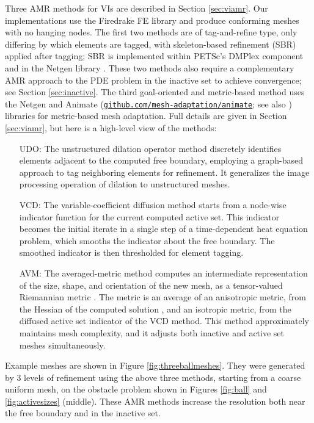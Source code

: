 \documentclass[]{interact}
\theoremstyle{plain}%
\theoremstyle{definition}
\theoremstyle{remark}
\begin{document}
Three AMR methods for VIs are described in Section \ref{sec:viamr}.  Our implementations use the Firedrake FE library \cite{Rathgeberetal2016} and produce conforming meshes with no hanging nodes.  The first two methods are of tag-and-refine type, only differing by which elements are tagged, with skeleton-based refinement (SBR) \cite{PlazaCarey2000} applied after tagging; SBR is implemented within PETSc's DMPlex component \cite{petsc-user-ref} and in the Netgen library \cite{Betteridgeetal2024}.  These two methods also require a complementary AMR approach to the PDE problem in the inactive set to achieve convergence; see Section \ref{sec:inactive}.  The third goal-oriented and metric-based method uses the Netgen and Animate (\href{https://github.com/mesh-adaptation/animate}{{\small \texttt{github.com/mesh-adaptation/animate}}}; see also \cite{Wallworketal2020}) libraries for metric-based mesh adaptation.  Full details are given in Section \ref{sec:viamr}, but here is a high-level view of the methods:

\begin{itemize}
\item[UDO:] The unstructured dilation operator method discretely identifies elements adjacent to the computed free boundary, employing a graph-based approach to tag neighboring elements for refinement.  It generalizes the image processing operation of dilation \cite{Pratt1991} to unstructured meshes.
\item[VCD:] The variable-coefficient diffusion method starts from a node-wise indicator function for the current computed active set.  This indicator becomes the initial iterate in a single step of a time-dependent heat equation problem, which smooths the indicator about the free boundary.  The smoothed indicator is then thresholded for element tagging.
\item[AVM:] The averaged-metric method computes an intermediate representation of the size, shape, and orientation of the new mesh, as a tensor-valued Riemannian metric \cite{Alauzet2010}.  The metric is an average of an anisotropic metric, from the Hessian of the computed solution \cite{Wallworketal2020}, and an isotropic metric, from the diffused active set indicator of the VCD method.  This method approximately maintains mesh complexity, and it adjusts both inactive and active set meshes simultaneously.
\end{itemize}

Example meshes are shown in Figure \ref{fig:threeballmeshes}.  They were generated by 3 levels of refinement using the above three methods, starting from a coarse uniform mesh, on the obstacle problem shown in Figures \ref{fig:ball} and \ref{fig:activesizes} (middle).  These AMR methods increase the resolution both near the free boundary and in the inactive set.
\end{document}
